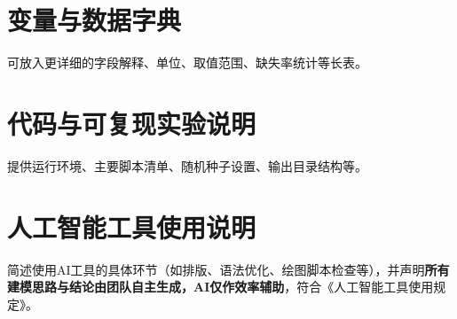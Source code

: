 \documentclass[12pt,a4paper]{ctexart}
\numberwithin{equation}{section}
\theoremstyle{mcm}
\begin{document}
\appendix
\section{变量与数据字典}
可放入更详细的字段解释、单位、取值范围、缺失率统计等长表。

\section{代码与可复现实验说明}
提供运行环境、主要脚本清单、随机种子设置、输出目录结构等。

\section{人工智能工具使用说明}
简述使用AI工具的具体环节（如排版、语法优化、绘图脚本检查等），并声明\textbf{所有建模思路与结论由团队自主生成，AI仅作效率辅助}，符合《人工智能工具使用规定》。
\end{document}
